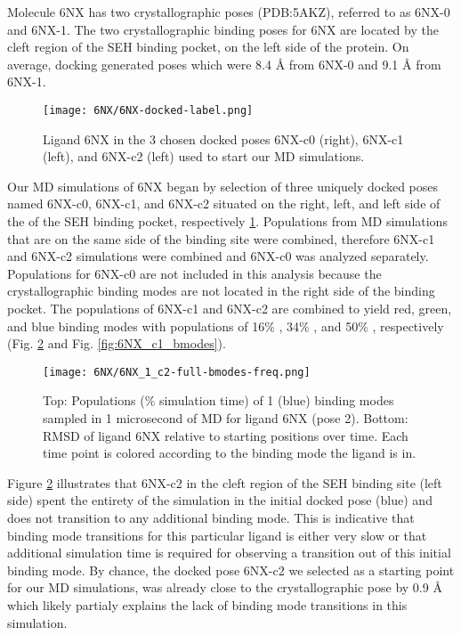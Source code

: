 \documentclass[journal=jcisd8,manuscript=article]{achemso}
\begin{document}
Molecule 6NX has two crystallographic poses (PDB:5AKZ), referred to as 6NX-0 and 6NX-1.
The two crystallographic binding poses for 6NX are located by the cleft region of the SEH binding pocket, on the left side of the protein. 
On average, docking generated poses which were 8.4 {\AA} from 6NX-0 and 9.1 {\AA} from 6NX-1. 

\begin{figure}
    \centering
    \texttt{[image: 6NX/6NX-docked-label.png]}
    \caption[Ligand 6NX Docked Poses]{Ligand 6NX in the 3 chosen docked poses 6NX-c0 (right), 6NX-c1 (left), and 6NX-c2 (left) used to start our MD simulations.}
    \label{fig:6NX-docked}
\end{figure}

Our MD simulations of 6NX began by selection of three uniquely docked poses named 6NX-c0, 6NX-c1, and 6NX-c2 situated on the right, left, and left side of the of the SEH binding pocket, respectively \ref{fig:6NX-docked}. 
Populations from MD simulations that are on the same side of the binding site were combined, therefore 6NX-c1 and 6NX-c2 simulations were combined and 6NX-c0 was analyzed separately.
Populations for 6NX-c0 are not included in this analysis because the crystallographic binding modes are not located in the right side of the binding pocket.
The populations of 6NX-c1 and 6NX-c2 are combined to yield red, green, and blue binding modes with populations of 16\% , 34\% , and 50\% , respectively (Fig. \ref{fig:6NX_c2_bmodes} and Fig. \ref{fig:6NX_c1_bmodes}). 

\begin{figure}
    \centering
    \texttt{[image: 6NX/6NX\_1\_c2-full-bmodes-freq.png]}
    \caption[Ligand 6NX pose 2 Binding Mode Populations]{Top: Populations (\% simulation time) of 1 (blue) binding modes sampled in 1 microsecond of MD for ligand 6NX (pose 2). Bottom: RMSD of ligand 6NX relative to starting positions over time. Each time point is colored according to the binding mode the ligand is in.}
    \label{fig:6NX_c2_bmodes}
\end{figure}
Figure \ref{fig:6NX_c2_bmodes} illustrates that 6NX-c2 in the cleft region of the SEH binding site (left side) spent the entirety of the simulation in the initial docked pose (blue) and does not transition to any additional binding mode.
This is indicative that binding mode transitions for this particular ligand is either very slow or that additional simulation time is required for observing a transition out of this initial binding mode.
By chance, the docked pose 6NX-c2 we selected as a starting point for our MD simulations, was already close to the crystallographic pose by 0.9 {\AA} which likely partialy explains the lack of binding mode transitions in this simulation.
\end{document}
